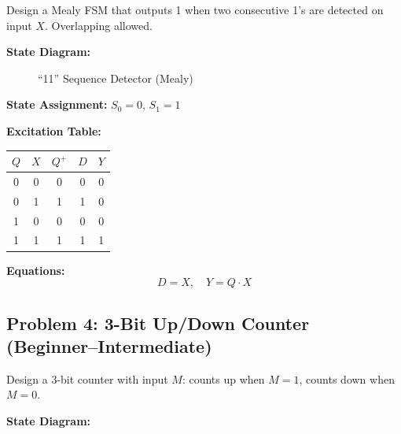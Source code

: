 \documentclass[12pt,a4paper]{article}
\begin{document}
\begin{infobox}
Design a Mealy FSM that outputs 1 when two consecutive 1's are detected on input $X$. Overlapping allowed.
\end{infobox}

\textbf{State Diagram:}

\begin{figure}[H]
\centering
{}
\caption{``11'' Sequence Detector (Mealy)}
\end{figure}

\textbf{State Assignment:} $S_0 = 0$, $S_1 = 1$

\textbf{Excitation Table:}

\begin{table}[H]
\centering
\begin{tabular}{cc|c|c|c}
\toprule
$Q$ & $X$ & $Q^+$ & $D$ & $Y$ \\
\midrule
0 & 0 & 0 & 0 & 0 \\
0 & 1 & 1 & 1 & 0 \\
1 & 0 & 0 & 0 & 0 \\
1 & 1 & 1 & 1 & 1 \\
\bottomrule
\end{tabular}
\end{table}

\textbf{Equations:}
\[
D = X, \quad Y = Q \cdot X
\]


\subsection{Problem 4: 3-Bit Up/Down Counter (Beginner--Intermediate)}

\begin{infobox}
Design a 3-bit counter with input $M$: counts up when $M=1$, counts down when $M=0$.
\end{infobox}

\textbf{State Diagram:}
\end{document}
